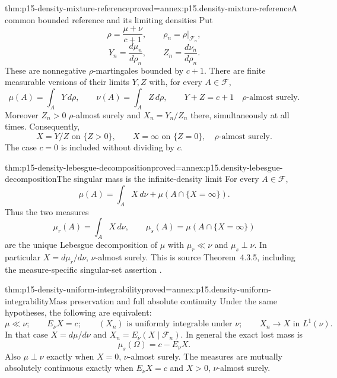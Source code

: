 \begin{hblemma}{thm:p15-density-mixture-reference}{proved=annex:p15.density-mixture-reference}{A common bounded reference and its limiting densities}
Put
\[
 \rho=\frac{\mu+\nu}{c+1},\qquad \rho_n=\rho|_{\mathcal F_n},
\]
\[
 Y_n=\frac{d\mu_n}{d\rho_n},\qquad
 Z_n=\frac{d\nu_n}{d\rho_n}.
\]
These are nonnegative \(\rho\)-martingales bounded by \(c+1\).
There are finite measurable versions of their limits \(Y,Z\) with,
for every \(A\in\mathcal F\),
\[
 \mu(A)=\int_A Y\,d\rho,\qquad
 \nu(A)=\int_A Z\,d\rho,\qquad
 Y+Z=c+1\quad\rho\text{-almost surely}.
\]
Moreover \(Z_n>0\) \(\rho\)-almost surely and
\(X_n=Y_n/Z_n\) there, simultaneously at all times. Consequently,
\[
 X=Y/Z\text{ on }\{Z>0\},\qquad
 X=\infty\text{ on }\{Z=0\},
 \quad \rho\text{-almost surely}.
\]
The case \(c=0\) is included without dividing by \(c\).
\end{hblemma}

\begin{hbtheorem}{thm:p15-density-lebesgue-decomposition}{proved=annex:p15.density-lebesgue-decomposition}{The singular mass is the infinite-density limit}
For every \(A\in\mathcal F\),
\[
                    \mu(A)=\int_A X\,d\nu+\mu(A\cap\{X=\infty\}).
\]
Thus the two measures
\[
 \mu_r(A)=\int_A X\,d\nu,\qquad
 \mu_s(A)=\mu(A\cap\{X=\infty\})
\]
are the unique Lebesgue decomposition of \(\mu\) with
\(\mu_r\ll\nu\) and \(\mu_s\perp\nu\). In particular
\(X=d\mu_r/d\nu\), \(\nu\)-almost surely. This is source
Theorem~4.3.5, including the measure-specific singular-set assertion
\cite[pp.~227--229]{DurrettPTEAuthor2019}.
\end{hbtheorem}

\begin{hbtheorem}{thm:p15-density-uniform-integrability}{proved=annex:p15.density-uniform-integrability}{Mass preservation and full absolute continuity}
Under the same hypotheses, the following are equivalent:
\[
 \mu\ll\nu;\qquad E_\nu X=c;\qquad
 (X_n)\text{ is uniformly integrable under }\nu;\qquad
 X_n\longrightarrow X\text{ in }L^1(\nu).
\]
In that case \(X=d\mu/d\nu\) and \(X_n=E_\nu(X\mid\mathcal F_n)\).
In general the exact lost mass is
\[
                    \mu_s(\Omega)=c-E_\nu X.
\]
Also \(\mu\perp\nu\) exactly when \(X=0\), \(\nu\)-almost surely.
The measures are mutually absolutely continuous exactly when
\(E_\nu X=c\) and \(X>0\), \(\nu\)-almost surely.
\end{hbtheorem}

